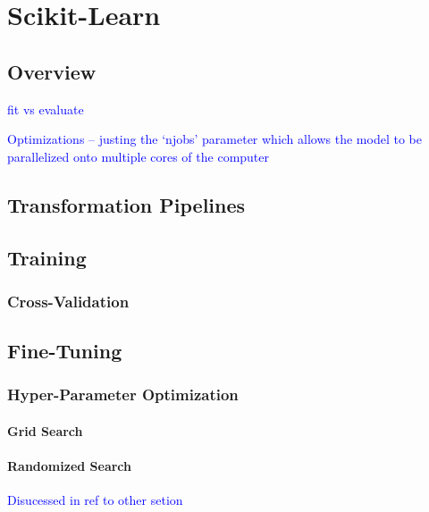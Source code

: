 \section{Scikit-Learn}

\subsection{Overview}

\textcolor{blue}{fit vs evaluate}

\textcolor{blue}{Optimizations -- justing the `njobs' parameter which allows the model to be parallelized onto multiple cores of the computer}


\subsection{Transformation Pipelines}

\subsection{Training}

\subsubsection{Cross-Validation}

\subsection{Fine-Tuning}

\subsubsection{Hyper-Parameter Optimization}

\paragraph{Grid Search}

\paragraph{Randomized Search}

\textcolor{blue}{Disucessed in ref to other setion}